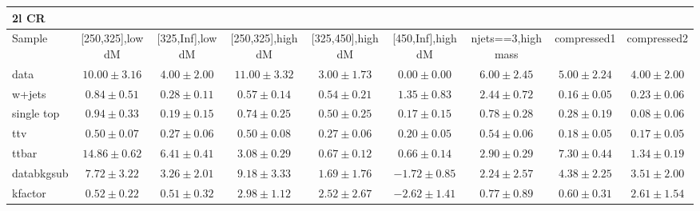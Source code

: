 \begin{table}
\begin{center}
\small
\begin{tabular}{lcccccccc}
\hline
2l CR & & & & & & & &\\
\hline
Sample&[250,325],low dM&[325,Inf],low dM&[250,325],high dM&[325,450],high dM&[450,Inf],high dM&njets==3,high mass&compressed1&compressed2\\
\hline
data&$10.00\pm3.16$&$4.00\pm2.00$&$11.00\pm3.32$&$3.00\pm1.73$&$0.00\pm0.00$&$6.00\pm2.45$&$5.00\pm2.24$&$4.00\pm2.00$\\
\hline
w+jets&$0.84\pm0.51$&$0.28\pm0.11$&$0.57\pm0.14$&$0.54\pm0.21$&$1.35\pm0.83$&$2.44\pm0.72$&$0.16\pm0.05$&$0.23\pm0.06$\\
single top&$0.94\pm0.33$&$0.19\pm0.15$&$0.74\pm0.25$&$0.50\pm0.25$&$0.17\pm0.15$&$0.78\pm0.28$&$0.28\pm0.19$&$0.08\pm0.06$\\
ttv&$0.50\pm0.07$&$0.27\pm0.06$&$0.50\pm0.08$&$0.27\pm0.06$&$0.20\pm0.05$&$0.54\pm0.06$&$0.18\pm0.05$&$0.17\pm0.05$\\
ttbar&$14.86\pm0.62$&$6.41\pm0.41$&$3.08\pm0.29$&$0.67\pm0.12$&$0.66\pm0.14$&$2.90\pm0.29$&$7.30\pm0.44$&$1.34\pm0.19$\\
databkgsub&$7.72\pm3.22$&$3.26\pm2.01$&$9.18\pm3.33$&$1.69\pm1.76$&$-1.72\pm0.85$&$2.24\pm2.57$&$4.38\pm2.25$&$3.51\pm2.00$\\
kfactor&$0.52\pm0.22$&$0.51\pm0.32$&$2.98\pm1.12$&$2.52\pm2.67$&$-2.62\pm1.41$&$0.77\pm0.89$&$0.60\pm0.31$&$2.61\pm1.54$\\
\hline\hline
\end{tabular}
\end{center}
\end{table}
